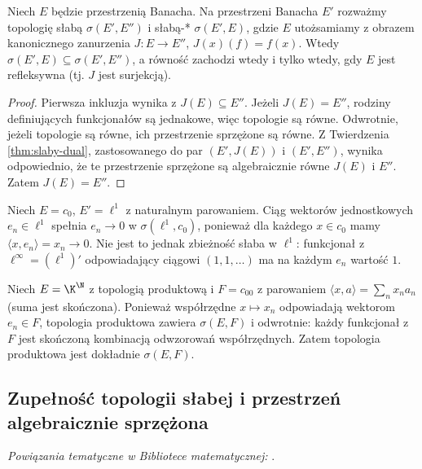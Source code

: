 \begin{stwierdzenie}
\label{prop:slaba-weakstar}
Niech $E$ będzie przestrzenią Banacha. Na przestrzeni
Banacha $E'$ rozważmy topologię słabą
$\sigma(E',E'')$ i słabą-* $\sigma(E',E)$,
gdzie $E$ utożsamiamy z obrazem kanonicznego zanurzenia
$J:E\to E''$, $J(x)(f)=f(x)$.
Wtedy $\sigma(E',E)\subseteq\sigma(E',E'')$,
a równość zachodzi wtedy i tylko wtedy, gdy $E$ jest
refleksywna (tj. $J$ jest surjekcją).
\end{stwierdzenie}
\begin{proof}
Pierwsza inkluzja wynika z $J(E)\subseteq E''$.
Jeżeli $J(E)=E''$, rodziny definiujących funkcjonałów
są jednakowe, więc topologie są równe.
Odwrotnie, jeżeli topologie są równe, ich przestrzenie
sprzężone są równe. Z Twierdzenia
\ref{thm:slaby-dual}, zastosowanego do par
$(E',J(E))$ i $(E',E'')$, wynika odpowiednio,
że te przestrzenie sprzężone są algebraicznie równe
$J(E)$ i $E''$. Zatem $J(E)=E''$.
\end{proof}

\begin{przyklad}
Niech $E=c_0$, $E'=\ell^1$ z naturalnym parowaniem.
Ciąg wektorów jednostkowych $e_n\in\ell^1$ spełnia
$e_n\to0$ w $\sigma(\ell^1,c_0)$, ponieważ dla każdego
$x\in c_0$ mamy $\langle x,e_n\rangle=x_n\to0$.
Nie jest to jednak zbieżność słaba w $\ell^1$:
funkcjonał z $\ell^\infty=(\ell^1)'$ odpowiadający
ciągowi $(1,1,\ldots)$ ma na każdym $e_n$ wartość $1$.
\end{przyklad}

\begin{przyklad}
Niech $E=\K^{\N}$ z topologią produktową i $F=c_{00}$
z parowaniem $\langle x,a\rangle=\sum_n x_na_n$
(suma jest skończona). Ponieważ współrzędne
$x\mapsto x_n$ odpowiadają wektorom $e_n\in F$,
topologia produktowa zawiera $\sigma(E,F)$ i odwrotnie:
każdy funkcjonał z $F$ jest skończoną kombinacją
odwzorowań współrzędnych. Zatem topologia produktowa
jest dokładnie $\sigma(E,F)$.
\end{przyklad}

\subsection{Zupełność topologii słabej i przestrzeń algebraicznie sprzężona}

\noindent\emph{Powiązania tematyczne w Bibliotece matematycznej:} .


